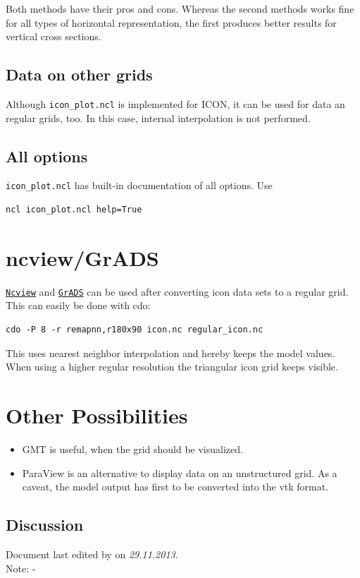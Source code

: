 Both methods have their pros and cons. Whereas the second methods works fine for all types of horizontal representation, the first produces better results for vertical cross sections.

\subsection{Data on other grids}
Although {\tt icon\_plot.ncl} is implemented for ICON, it can be used for data an regular grids, too. In this case, internal interpolation is not performed.

\subsection{All options}\label{all_options}
{\tt icon\_plot.ncl} has built-in documentation of all options. Use
\begin{small}
\begin{verbatim}
ncl icon_plot.ncl help=True 
\end{verbatim}
\end{small}


\section{ncview/GrADS}
\href{http://meteora.ucsd.edu/~pierce/ncview_home_page.html}{\tt Ncview} and \href{http://www.iges.org/grads/}{\tt GrADS} can be used after converting icon data sets to a regular grid. This can easily be done with cdo:
\begin{small}
\begin{verbatim}
cdo -P 8 -r remapnn,r180x90 icon.nc regular_icon.nc
\end{verbatim}
\end{small}
This uses nearest neighbor interpolation and hereby keeps the model values. When using a higher regular resolution the triangular icon grid keeps visible.

\section{Other Possibilities}
\begin{itemize}
\item GMT is useful, when the grid should be visualized.
\item ParaView is an alternative to display data on an unstructured grid. As a caveat, the model output has first to be converted into the vtk format.
\end{itemize}


\newpage
\subsection*{Discussion}

Document last edited by \textit{\krauti} on \textit{29.11.2013}.\\
Note: -
